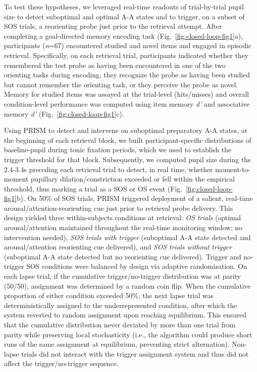 To test these hypotheses, we leveraged real-time readouts of trial-by-trial pupil size to detect suboptimal and optimal A-A states and to trigger, on a subset of SOS trials, a reorienting probe just prior to the retrieval attempt. After completing a goal-directed memory encoding task (Fig.~\ref{fig:closed-loop-fig1}a), participants (\textit{n}=67) encountered studied and novel items and engaged in episodic retrieval. Specifically, on each retrieval trial, participants indicated whether they remembered the test probe as having been encountered in one of the two orienting tasks during encoding, they recognize the probe as having been studied but cannot remember the orienting task, or they perceive the probe as novel. Memory for studied items was assayed at the trial-level (hits/misses) and overall condition-level performance was computed using item memory \textit{d'} and associative memory \textit{d'} (Fig.~\ref{fig:closed-loop-fig1}c). 

Using PRISM to detect and intervene on suboptimal preparatory A-A states, at the beginning of each retrieval block, we built participant-specific distributions of baseline-pupil during tonic fixation periods, which we used to establish the trigger threshold for that block. Subsequently, we computed pupil size during the 2.4-3.4s preceding each retrieval trial to detect, in real time, whether moment-to-moment pupillary dilation/constriction exceeded or fell within the empirical threshold, thus marking a trial as a SOS or OS event (Fig.~\ref{fig:closed-loop-fig1}b). On 50\% of SOS trials, PRISM triggered deployment of a salient, real-time arousal/attention-reorienting cue just prior to retrieval probe delivery. This design yielded three within-subjects conditions at retrieval: \textit{OS trials} (optimal arousal/attention maintained throughout the real-time monitoring window; no intervention needed), \textit{SOS trials with trigger} (suboptimal A-A state detected and arousal/attention reorienting cue delivered), and \textit{SOS trials without trigger} (suboptimal A-A state detected but no reorienting cue delivered).  Trigger and no-trigger SOS conditions were balanced by design via adaptive randomization. On each lapse trial, if the cumulative trigger/no-trigger distribution was at parity (50/50), assignment was determined by a random coin flip. When the cumulative proportion of either condition exceeded 50\%, the next lapse trial was deterministically assigned to the underrepresented condition, after which the system reverted to random assignment upon reaching equilibrium. This ensured that the cumulative distribution never deviated by more than one trial from parity while preserving local stochasticity (i.e., the algorithm could produce short runs of the same assignment at equilibrium, preventing strict alternation). Non-lapse trials did not interact with the trigger assignment system and thus did not affect the trigger/no-trigger sequence.

